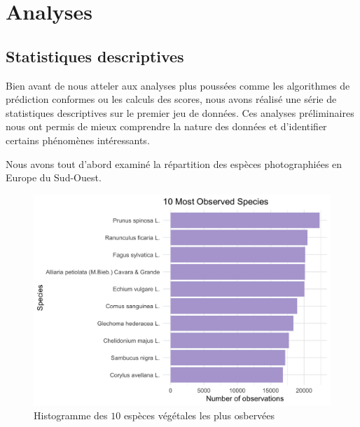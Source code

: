 \documentclass[a4paper,12pt]{article}
\begin{document}

\section{Analyses}


\subsection{Statistiques descriptives}

Bien avant de nous atteler aux analyses plus poussées comme les algorithmes de prédiction conformes ou les calculs des scores, nous avons réalisé une série de statistiques descriptives sur le premier jeu de données. Ces analyses préliminaires nous ont permis de mieux comprendre la nature des données et d'identifier certains phénomènes intéressants.

\vspace{0.2cm}

Nous avons tout d'abord examiné la répartition des espèces photographiées en Europe du Sud-Ouest.

\begin{figure}[H]
  \centering
  \includegraphics[scale=0.3]{images/10_Most_Observed_Species.png}
  \caption{Histogramme des $10$ espèces végétales les plus osbervées}
  \label{fig1}
\end{figure}
\end{document}

